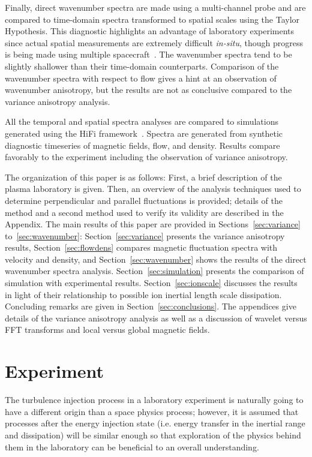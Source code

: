 \documentclass[preprint2]{aastex}
\begin{document}
Finally, direct wavenumber spectra are made using a multi-channel probe and are compared to time-domain spectra transformed to spatial scales using the Taylor Hypothesis. This diagnostic highlights an advantage of laboratory experiments since actual spatial measurements are extremely difficult {\it in-situ}, though progress is being made using multiple spacecraft~\citep{sah06,sah10}.  The wavenumber spectra tend to be slightly shallower than their time-domain counterparts. Comparison of the wavenumber spectra with respect to flow gives a hint at an observation of wavenumber anisotropy, but the results are not as conclusive compared to the variance anisotropy analysis.

All the temporal and spatial spectra analyses are compared to simulations generated using the HiFi framework~\citep{sch14a}. Spectra are generated from synthetic diagnostic timeseries of magnetic fields, flow, and density. Results compare favorably to the experiment including the observation of variance anisotropy.

The organization of this paper is as follows: First, a brief description of the plasma laboratory is given. Then, an overview of the analysis techniques used to determine perpendicular and parallel fluctuations is provided; details of the method and a second method used to verify its validity are described in the Appendix. The main results of this paper are provided in Sections~\ref{sec:variance} to~\ref{sec:wavenumber}: Section~\ref{sec:variance} presents the variance anisotropy results, Section~\ref{sec:flowdens} compares magnetic fluctuation spectra with velocity and density, and Section~\ref{sec:wavenumber} shows the results of the direct wavenumber spectra analysis. Section~\ref{sec:simulation} presents the comparison of simulation with experimental results. Section~\ref{sec:ionscale} discusses the results in light of their relationship to possible ion inertial length scale dissipation. Concluding remarks are given in Section~\ref{sec:conclusions}. The appendices give details of the variance anisotropy analysis as well as a discussion of wavelet versus FFT transforms and local versus global magnetic fields.

\section{Experiment}\label{sec:experiment}

The turbulence injection process in a laboratory experiment is naturally going to have a different origin than a space physics process; however, it is assumed that processes after the energy injection state (i.e. energy transfer in the inertial range and dissipation) will be similar enough so that exploration of the physics behind them in the laboratory can be beneficial to an overall understanding.
\end{document}

